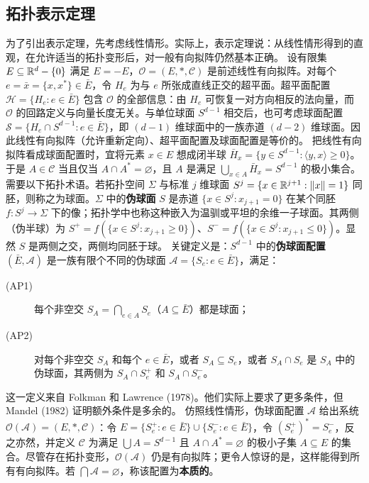 \subsection*{拓扑表示定理}
为了引出表示定理，先考虑线性情形。实际上，表示定理说：从线性情形得到的直观，在允许适当的拓扑变形后，对一般有向拟阵仍然基本正确。
设有限集 $E\subseteq\mathbb R^d-\{0\}$ 满足 $E=-E$，$\mathcal O=(E,*,\mathcal C)$ 是前述线性有向拟阵。对每个 $e=\bar x=\{x,x^*\}\in\bar E$，令 $H_e$ 为与 $e$ 所张成直线正交的超平面。超平面配置 $\mathcal H=\{H_e:e\in\bar E\}$ 包含 $\mathcal O$ 的全部信息：由 $H_e$ 可恢复一对方向相反的法向量，而 $\mathcal O$ 的回路定义与向量长度无关。与单位球面 $S^{d-1}$ 相交后，也可考虑球面配置 $\mathcal S=\{H_e\cap S^{d-1}:e\in\bar E\}$，即 $(d-1)$ 维球面中的一族赤道 $(d-2)$ 维球面。因此线性有向拟阵（允许重新定向）、超平面配置及球面配置是等价的。
把线性有向拟阵看成球面配置时，宜将元素 $x\in E$ 想成闭半球 $\bar H_x=\{y\in S^{d-1}:\langle y,x\rangle\ge0\}$。于是 $A\in\mathcal C$ 当且仅当 $A\cap A^*=\varnothing$，且 $A$ 是满足 $\bigcup_{x\in A}\bar H_x=S^{d-1}$ 的极小集合。
需要以下拓扑术语。若拓扑空间 $\Sigma$ 与标准 $j$ 维球面 $S^j=\{x\in\mathbb R^{j+1}:\|x\|=1\}$ 同胚，则称之为球面。$\Sigma$ 中的\textbf{伪球面} $S$ 是赤道 $\{x\in S^j:x_{j+1}=0\}$ 在某个同胚 $f:S^j\to\Sigma$ 下的像；拓扑学中也称这种嵌入为温驯或平坦的余维一子球面。其两侧（伪半球）为 $S^+=f(\{x\in S^j:x_{j+1}\ge0\})$、$S^-=f(\{x\in S^j:x_{j+1}\le0\})$。显然 $S$ 是两侧之交，两侧均同胚于球。
关键定义是：$S^{d-1}$ 中的\textbf{伪球面配置} $(\bar E,\mathcal A)$ 是一族有限个不同的伪球面 $\mathcal A=\{S_e:e\in\bar E\}$，满足：
\begin{description}
\item[(AP1)] 每个非空交 $S_A=\bigcap_{e\in A}S_e$（$A\subseteq\bar E$）都是球面；
\item[(AP2)] 对每个非空交 $S_A$ 和每个 $e\in\bar E$，或者 $S_A\subseteq S_e$，或者 $S_A\cap S_e$ 是 $S_A$ 中的伪球面，其两侧为 $S_A\cap S_e^+$ 和 $S_A\cap S_e^-$。
\end{description}
这一定义来自 Folkman 和 Lawrence (1978)。他们实际上要求了更多条件，但 Mandel (1982) 证明额外条件是多余的。
仿照线性情形，伪球面配置 $\mathcal A$ 给出系统 $\mathcal O(\mathcal A)=(E,*,\mathcal C)$：令 $E=\{S_e^+:e\in\bar E\}\cup\{S_e^-:e\in\bar E\}$，令 $(S_e^+)^*=S_e^-$，反之亦然，并定义 $\mathcal C$ 为满足 $\bigcup A=S^{d-1}$ 且 $A\cap A^*=\varnothing$ 的极小子集 $A\subseteq E$ 的集合。尽管存在拓扑变形，$\mathcal O(\mathcal A)$ 仍是有向拟阵；更令人惊讶的是，这样能得到所有有向拟阵。若 $\bigcap\mathcal A=\varnothing$，称该配置为\textbf{本质的}。

